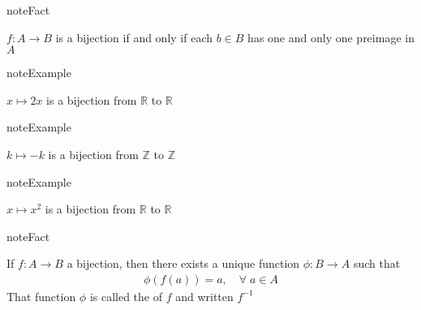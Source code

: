 \documentclass[letterpaper,10pt,english]{jupyterBook}
\begin{document}
\begin{figure}[htbp]
\centering

\noindent{}
\end{figure}

\begin{sphinxadmonition}{note}{Fact}

\sphinxAtStartPar
\(f \colon A \to B\) is a bijection if and only if each \(b \in B\) has one and only one preimage in \(A\)
\end{sphinxadmonition}

\begin{sphinxadmonition}{note}{Example}

\sphinxAtStartPar
\(x \mapsto 2x\) is a bijection from \(\mathbb{R}\) to \(\mathbb{R}\)
\end{sphinxadmonition}

\begin{figure}[htbp]
\centering

\noindent{}
\end{figure}

\begin{sphinxadmonition}{note}{Example}

\sphinxAtStartPar
\(k \mapsto -k\) is a bijection from \(\mathbb{Z}\) to \(\mathbb{Z}\)
\end{sphinxadmonition}

\begin{figure}[htbp]
\centering

\noindent{}
\end{figure}

\begin{sphinxadmonition}{note}{Example}

\sphinxAtStartPar
\(x \mapsto x^2\) is  a bijection from \(\mathbb{R}\) to \(\mathbb{R}
\)
\end{sphinxadmonition}

\begin{figure}[htbp]
\centering

\noindent{}
\end{figure}

\begin{sphinxadmonition}{note}{Fact}

\sphinxAtStartPar
If \(f \colon A \to B\) a bijection, then there exists a unique
function \(\phi \colon B \to A\) such that
\begin{equation*}
\begin{split}
\phi(f(a)) = a, \quad \forall \; a \in A
\end{split}
\end{equation*}
\sphinxAtStartPar
That function \(\phi\) is called the  of \(f\) and written \(f^{-1}\)
\end{sphinxadmonition}
\end{document}
